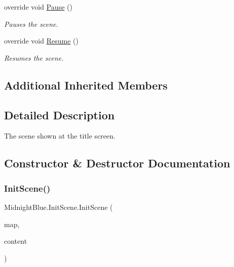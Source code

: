 \begin{DoxyCompactItemize}
override void \hyperlink{class_midnight_blue_1_1_init_scene_adbcab013e715e5c49ad09bcd0545d994}{Pause} ()
\begin{DoxyCompactList}\small\item\em Pauses the scene. \end{DoxyCompactList}\item 
override void \hyperlink{class_midnight_blue_1_1_init_scene_a01ade76252a492d20181bd2e00eb217f}{Resume} ()
\begin{DoxyCompactList}\small\item\em Resumes the scene. \end{DoxyCompactList}\end{DoxyCompactItemize}
\subsection*{Additional Inherited Members}


\subsection{Detailed Description}
The scene shown at the title screen. 



\subsection{Constructor \& Destructor Documentation}
\hypertarget{class_midnight_blue_1_1_init_scene_a6458d599d89e074484645974a1975f46}{}\label{class_midnight_blue_1_1_init_scene_a6458d599d89e074484645974a1975f46} 
\subsubsection{\texorpdfstring{Init\+Scene()}{InitScene()}}
{\footnotesize\ttfamily Midnight\+Blue.\+Init\+Scene.\+Init\+Scene (\begin{DoxyParamCaption}\item[{\hyperlink{class_m_b2_d_1_1_entity_component_1_1_entity_map}{Entity\+Map}}]{map,  }\item[{Content\+Manager}]{content }\end{DoxyParamCaption})\hspace{0.3cm}{\ttfamily [inline]}}



